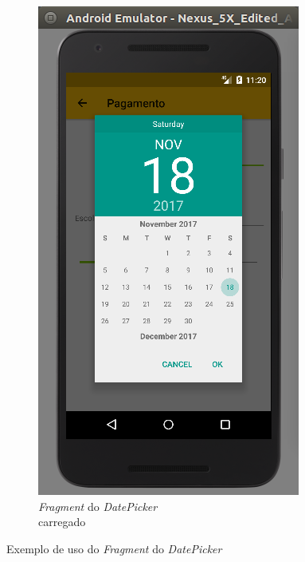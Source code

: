 \documentclass[hidelinks,12pt]{article}
\begin{document}
\begin{figure}[H]
\begin{subfigure}{0.5\textwidth}
		\includegraphics[scale=0.5]{int:main_cal}
		\caption{\textit{Fragment} do \textit{DatePicker} \\\hspace{\textwidth}carregado}
		\label{int:main_cal}
	\end{subfigure}
	\caption{Exemplo de uso do \textit{Fragment} do \textit{DatePicker}}
	\label{main_calendar}
\end{figure}
\end{document}
